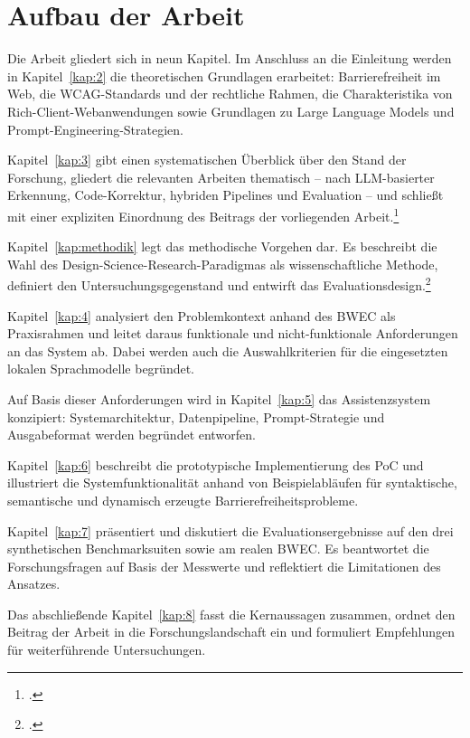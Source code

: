 \section{Aufbau der Arbeit}

Die Arbeit gliedert sich in neun Kapitel. Im Anschluss an die Einleitung werden in Kapitel~\ref{kap:2} die theoretischen Grundlagen erarbeitet: Barrierefreiheit im Web, die \ac{WCAG}-Standards und der rechtliche Rahmen, die Charakteristika von Rich-Client-Web\-an\-wen\-dun\-gen sowie Grundlagen zu Large Language Models und Prompt-Engineering-Strategien.

Kapitel~\ref{kap:3} gibt einen systematischen Überblick über den Stand der Forschung, gliedert die relevanten Arbeiten thematisch -- nach \ac{LLM}-basierter Erkennung, Code-Korrektur, hybriden Pipelines und Evaluation -- und schließt mit einer expliziten Einordnung des Beitrags der vorliegenden Arbeit.\footcite[Vgl.][]{WebsterWatson2002}

Kapitel~\ref{kap:methodik} legt das methodische Vorgehen dar. Es beschreibt die Wahl des De\-sign-Sci\-ence-Re\-search-Para\-dig\-mas als wissenschaftliche Methode, definiert den Untersuchungsgegenstand und entwirft das Evaluationsdesign.\footcite[Vgl.][S. 75]{hevner2004dsr}

Kapitel~\ref{kap:4} analysiert den Problemkontext anhand des \ac{BWEC} als Praxisrahmen und leitet daraus funktionale und nicht-funktionale Anforderungen an das System ab. Dabei werden auch die Auswahlkriterien für die eingesetzten lokalen Sprachmodelle begründet.

Auf Basis dieser Anforderungen wird in Kapitel~\ref{kap:5} das Assistenzsystem konzipiert: Systemarchitektur, Datenpipeline, Prompt-Strategie und Ausgabeformat werden begründet entworfen.

Kapitel~\ref{kap:6} beschreibt die prototypische Implementierung des \ac{PoC} und illustriert die Systemfunktionalität anhand von Beispielabläufen für syntaktische, semantische und dynamisch erzeugte Barrierefreiheitsprobleme.

Kapitel~\ref{kap:7} präsentiert und diskutiert die Evaluationsergebnisse auf den drei synthetischen Benchmarksuiten sowie am realen \ac{BWEC}. Es beantwortet die Forschungsfragen auf Basis der Messwerte und reflektiert die Limitationen des Ansatzes.

Das abschließende Kapitel~\ref{kap:8} fasst die Kernaussagen zusammen, ordnet den Beitrag der Arbeit in die Forschungslandschaft ein und formuliert Empfehlungen für weiterführende \mbox{Untersuchungen}.